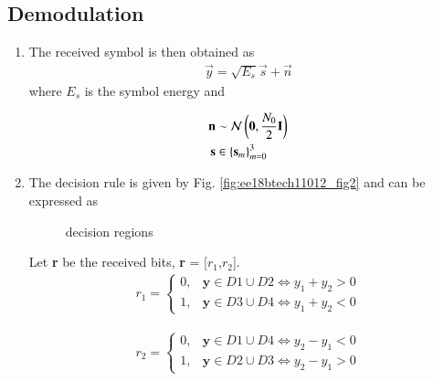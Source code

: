 \subsection{Demodulation}
\begin{enumerate}[label=\thesubsection.\arabic*.,ref=\thesubsection.\theenumi]
\item The received symbol is then obtained as
\begin{align}
\vec{y} = \sqrt{E_s}\vec{s} + \vec{n}
\end{align}
%
where $E_s$ is the symbol energy and 

\begin{align}
\mathbf{n} &\sim \mathcal{N}\left(\mathbf{0},\frac{N_0}{2}\mathbf{I}\right)
\\
\mathbf{s} &\in \left\{\mathbf{s}_m\right\}_{m = 0}^{3}
\end{align}
\item The decision rule is given by Fig. \ref{fig:ee18btech11012_fig2} and can be expressed as







\begin{figure}[!ht]

                \resizebox{\columnwidth}{!}{}

\label{fig:ee18btech11041_fig2}
\caption{decision regions}
	
\end{figure}

Let \textbf{r} be the received bits, \textbf{r} = [$r_1$,$r_2$]. 
\begin{align}
    r_1 = 
    \begin{cases}
    0, &  \textbf{y} \in D1\cup D2 \Longleftrightarrow  y_1 + y_2 > 0\\
    1, &  \textbf{y} \in D3\cup D4 \Longleftrightarrow  y_1 + y_2 < 0
    \end{cases}
    \label{eq:ee18btech11041_eq1}
\end{align}

\begin{align}
    r_2 = 
    \begin{cases}
    0, &  \textbf{y} \in D1\cup D4 \Longleftrightarrow  y_2 - y_1 < 0\\
    1, &  \textbf{y} \in D2\cup D3 \Longleftrightarrow  y_2 - y_1 > 0
    \end{cases}
    \label{eq:ee18btech11041_eq2}
\end{align}


\end{enumerate}
